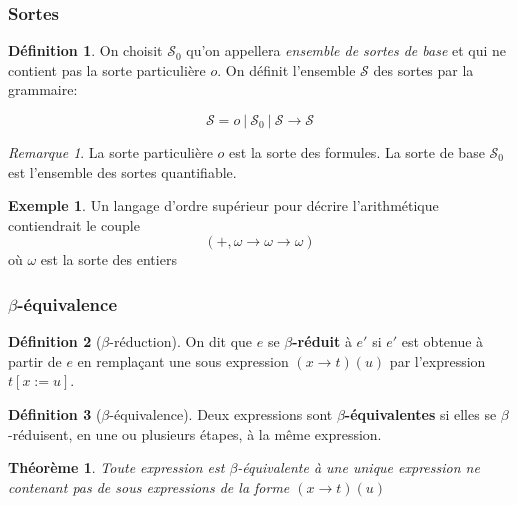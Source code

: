 \documentclass[11pt,a4paper]{beamer}
\theoremstyle{plain}
\newtheorem{thm}{Théorème}[section]
\theoremstyle{definition}
\newtheorem{defn}{Définition}[section]
\newtheorem{exmp}{Exemple}[section]
\theoremstyle{remark}
\newtheorem*{rem}{Remarque}
\begin{document}
\begin{frame}
\frametitle{Sortes}
\begin{defn}
On choisit $\mathcal{S}_0$ qu'on appellera \textit{ensemble de sortes de base} et qui ne contient pas la sorte particulière $o$. On définit l'ensemble $\mathcal{S}$ des sortes par la grammaire:

\[ \mathcal{S} = o~|~\mathcal{S}_0~|~\mathcal{S}\rightarrow\mathcal{S} \]
\end{defn}

\begin{rem}
La sorte particulière $o$ est la sorte des formules.
La sorte de base $\mathcal{S}_0$ est l'ensemble des sortes quantifiable.
\end{rem}

\begin{exmp}
Un langage d'ordre supérieur pour décrire l'arithmétique contiendrait le couple
\[ \left(+, \omega \rightarrow \omega \rightarrow \omega\right) \]
où $\omega$ est la sorte des entiers
\end{exmp}
\end{frame}

\begin{frame}
\frametitle{$\beta$-équivalence}
\begin{defn}[$\beta$-réduction]
On dit que $e$ se \textbf{$\beta$-réduit} à $e'$ si $e'$ est obtenue à partir de $e$ en remplaçant une sous expression $(x\rightarrow t)(u)$ par l'expression $t[x:=u]$.
\end{defn}

\begin{defn}[$\beta$-équivalence]
Deux expressions sont \textbf{$\beta$-équivalentes} si elles se $\beta$-réduisent, en une ou plusieurs étapes, à la même expression.
\end{defn}

\begin{thm}
Toute expression est $\beta$-équivalente à une unique expression ne contenant pas de sous expressions de la forme $(x\rightarrow t)(u)$
\end{thm}
\end{frame}
\end{document}
